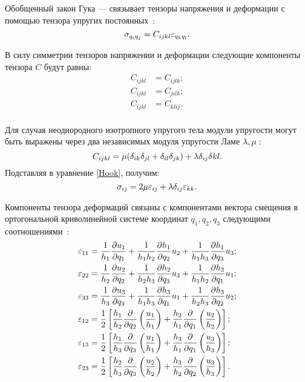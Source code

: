 Обобщенный закон Гука --- связывает тензоры напряжения и деформации с помощью тензора упругих постоянных~\cite{Nowacki}:
\begin{equation}\label{Hook}
\sigma_{q_iq_j}=C_{ijkl}\varepsilon_{q_kq_l}.
\end{equation}

В силу симметрии тензоров напряжении и деформации следующие компоненты тензора $C$ будут равны:
\begin{equation*}
\begin{split}
C_{ijkl}&=C_{ijlk};\\
C_{ijkl}&=C_{jilk};\\
C_{ijkl}&=C_{klij}.\\
\end{split}
\end{equation*}

Для случая неоднородного изотропного упругого тела модули упругости могут быть выражены через два независимых модуля упругости Ламе $\lambda, \mu:$
$$
C_{ijkl} = \mu(\delta_{ik}\delta_{jl}+\delta_{il}\delta_{jk}) + \lambda\delta_{ij}\delta{kl}.
$$
Подставляя в уравнение \eqref{Hook}, получим:
\begin{equation}\label{Hook2}
\sigma_{ij}=2\mu\varepsilon_{ij}+\lambda\delta_{ij}\varepsilon_{kk}.
\end{equation}

Компоненты тензора деформаций связаны с компонентами вектора смещения в ортогональной криволинейной системе координат $q_1,q_2,q_3$ следующими соотношениями~\cite{Nowacki}:
\begin{equation}\label{eq deform}
\begin{split}
\varepsilon_{11} &= \frac{1}{h_1}\frac{\partial u_1}{\partial q_1} + \frac{1}{h_1h_2}\frac{\partial h_1}{\partial q_2}u_2 + \frac{1}{h_1h_3}\frac{\partial h_1}{\partial q_3}u_3;\\
\varepsilon_{22} &= \frac{1}{h_2}\frac{\partial u_2}{\partial q_2} + \frac{1}{h_2h_3}\frac{\partial h_2}{\partial q_3}u_3 + \frac{1}{h_1h_2}\frac{\partial h_2}{\partial q_1}u_1;\\
\varepsilon_{33} &= \frac{1}{h_3}\frac{\partial u_3}{\partial q_3} + \frac{1}{h_1h_3}\frac{\partial h_3}{\partial q_1}u_1 + \frac{1}{h_2h_3}\frac{\partial h_3}{\partial q_2}u_2;\\
\varepsilon_{12} &= \frac12\left[\frac{h_1}{h_2}\frac{\partial}{\partial q_2}\left(\frac{u_1}{h_1}\right) + \frac{h_2}{h_1}\frac{\partial}{\partial q_1}\left(\frac{u_2}{h_2}\right) \right];\\
\varepsilon_{13} &= \frac12\left[\frac{h_1}{h_3}\frac{\partial}{\partial q_3}\left(\frac{u_1}{h_1}\right) + \frac{h_3}{h_1}\frac{\partial}{\partial q_1}\left(\frac{u_3}{h_3}\right) \right];\\
\varepsilon_{23} &= \frac12\left[\frac{h_2}{h_3}\frac{\partial}{\partial q_3}\left(\frac{u_2}{h_2}\right) + \frac{h_3}{h_2}\frac{\partial}{\partial q_2}\left(\frac{u_3}{h_3}\right) \right].\\
\end{split}
\end{equation}


